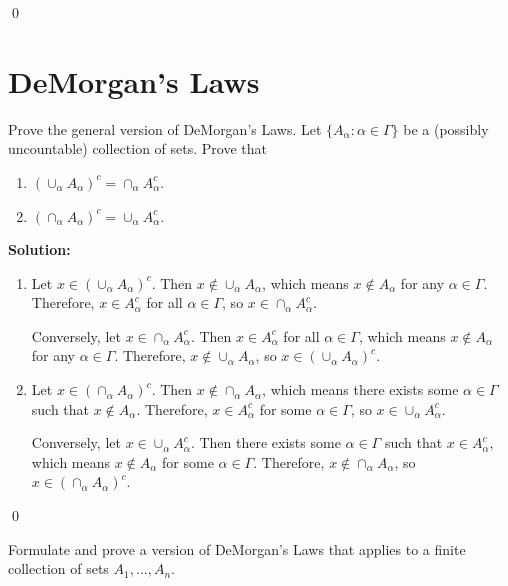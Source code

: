 \qed
\section{DeMorgan's Laws}

\begin{problembox}
Prove the general version of DeMorgan's Laws. Let $\{A_\alpha : \alpha \in \Gamma\}$ be a (possibly uncountable) collection of sets. Prove that
\begin{enumerate}[label=(\alph*)]
    \item $( \cup_{\alpha} A_\alpha )^c = \cap_{\alpha} A_\alpha^c$.
    \item $( \cap_{\alpha} A_\alpha )^c = \cup_{\alpha} A_\alpha^c$.
\end{enumerate}
\end{problembox}

\noindent\textbf{Solution:}
\begin{enumerate}[label=(\alph*)]
    \item Let $x \in (\cup_{\alpha} A_\alpha)^c$. Then $x \notin \cup_{\alpha} A_\alpha$, which means $x \notin A_\alpha$ for any $\alpha \in \Gamma$. Therefore, $x \in A_\alpha^c$ for all $\alpha \in \Gamma$, so $x \in \cap_{\alpha} A_\alpha^c$.
    
    Conversely, let $x \in \cap_{\alpha} A_\alpha^c$. Then $x \in A_\alpha^c$ for all $\alpha \in \Gamma$, which means $x \notin A_\alpha$ for any $\alpha \in \Gamma$. Therefore, $x \notin \cup_{\alpha} A_\alpha$, so $x \in (\cup_{\alpha} A_\alpha)^c$.
    
    \item Let $x \in (\cap_{\alpha} A_\alpha)^c$. Then $x \notin \cap_{\alpha} A_\alpha$, which means there exists some $\alpha \in \Gamma$ such that $x \notin A_\alpha$. Therefore, $x \in A_\alpha^c$ for some $\alpha \in \Gamma$, so $x \in \cup_{\alpha} A_\alpha^c$.
    
    Conversely, let $x \in \cup_{\alpha} A_\alpha^c$. Then there exists some $\alpha \in \Gamma$ such that $x \in A_\alpha^c$, which means $x \notin A_\alpha$ for some $\alpha \in \Gamma$. Therefore, $x \notin \cap_{\alpha} A_\alpha$, so $x \in (\cap_{\alpha} A_\alpha)^c$.
\end{enumerate}



\qed
\begin{problembox}
Formulate and prove a version of DeMorgan's Laws that applies to a finite collection of sets $A_1, \ldots, A_n$.
\end{problembox}

